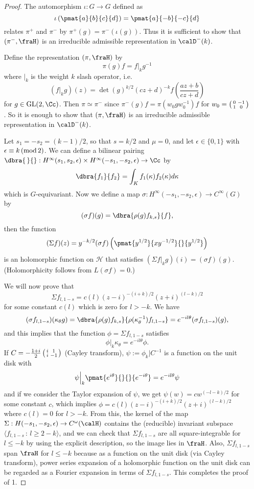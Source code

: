 \begin{proof}
The automorphism $\iota:G\to G$ defined as 
$$
\iota\left(\pmat{a}{b}{c}{d}\right)= \pmat{a}{-b}{-c}{d}
$$
relates $\pi^{+}$ and $\pi^{-}$ by $\pi^{+}(g)= \pi^{-}(\iota(g))$. Thus it is sufficient to show that $(\pi^{-}, \fraH)$ is an irreducible admissible representation in $\calD^{-}(k)$. 

Define the representation $(\pi, \fraH)$ by 
$$
\pi(g) f= f|_{k}g^{-1}
$$
where $|_{k}$ is the weight $k$ slash operator, i.e.
$$
(f|_{k}g)(z) = \det(g)^{k/2} (cz+d)^{-k} f\left( \frac{az+b}{cz+d}\right)
$$
for $g\in \GL(2, \Cc)$. Then $\pi\simeq \pi^{-}$ since $\pi^{-}(g)f = \pi(w_{0}gw_{0}^{-1})f$ for $w_{0} = \left(\begin{smallmatrix} 0 & -1 \\ 1 & 0 \end{smallmatrix}\right)$. So it is enough to show that $(\pi, \fraH)$ is an irreducible admissible representation in $\calD^{-}(k)$. 

Let $s_{1} = -s_{2} = (k-1)/2$, so that $s = k/2$ and $\mu = 0$, and let $\epsilon\in \{0, 1\}$ with $\epsilon\equiv k\,(\mathrm{mod}\,2)$. We can define a bilinear pairing $\dbra{\,}{}: H^{\infty}(s_{1}, s_{2}, \epsilon) \times H^{\infty} (-s_{1}, -s_{2}, \epsilon) \to \Cc$ by 
$$
\dbra{f_{1}}{f_{2}} = \int_{K} f_{1}(\kappa)f_{2}(\kappa) d\kappa
$$
which is $G$-equivariant. Now we define a map $\sigma:H^{\infty}(-s_{1}, -s_{2}, \epsilon)\to C^{\infty}(G)$ by 
$$
(\sigma f)(g) = \dbra{\rho(g)f_{k, s}}{f}, 
$$
then the function 
$$
(\Sigma f)(z) = y^{-k/2}(\sigma f)\left(\pmat{y^{1/2}}{xy^{-1/2}}{}{y^{1/2}}\right)
$$
is an holomorphic function on $\mathcal{H}$ that satisfies $(\Sigma f|_{k}g)(i) = (\sigma f)(g)$. 
(Holomorphicity follows from $L(\sigma f) =0$.)

We will now prove that 
$$
\Sigma f_{l, 1-s} = c(l) (z-i)^{-(i+k)/2}(z+i)^{(l-k)/2}
$$
for some constant $c(l)$ which is zero for $l>-k$. We have
$$
(\sigma f_{l, 1-s})(\kappa_{\theta}g) = \dbra{\rho(g)f_{k, s}}{\rho(\kappa_{\theta}^{-1})f_{l, 1-s}} = e^{-il\theta}(\sigma f_{l, 1-s})(g),
$$
and this implies that the function $\phi = \Sigma f_{l, 1-s}$ satisfies
$$
\phi|_{k}\kappa_{\theta} = e^{-il\theta}\phi. 
$$
If $C = -\frac{1+i}{2} \left(\begin{smallmatrix} i & 1 \\ i & -1 \end{smallmatrix}\right)$ (Cayley transform), $\psi:= \phi_{k}|C^{-1}$ is a function on the unit disk with
$$
\psi\Big|_{k} \pmat{e^{i\theta}}{}{}{e^{-i\theta}} = e^{-il\theta}\psi
$$
and if we consider the Taylor expansion of $\psi$, we get $\psi(w) = cw^{(-l-k)/2}$ for some constant $c$, which implies $\phi= c(l) (z-i)^{-(i+k)/2}(z+i)^{(l-k)/2}$ where $c(l) =0$ for $l>-k$. 
From this, the kernel of the map $\Sigma:H(-s_{1}, -s_{2}, \epsilon) \to C^{\omega}(\calH)$ contains the (reducible) invariant subspace $\langle f_{l, 1-s}\,:\, l\geq 2-k\rangle$, and we can check that $\Sigma f_{l, 1-s}$ are all square-integrable for $l\leq -k$ by using the explicit description, so the image lies in $\fraH$. Also, $\Sigma f_{l, 1-s}$ span $\fraH$ for $l\leq -k$ because as a function on the unit disk (via Cayley transform), power series expansion of a holomorphic function on the unit disk can be regarded as a Fourier expansion in terms of $\Sigma f_{l, 1-s}$.
This completes the proof of 1. 


\end{proof}
